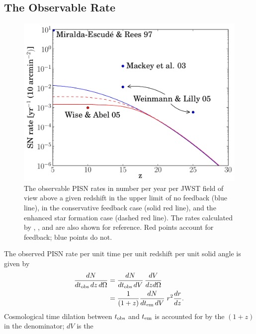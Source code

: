 \documentclass{thesis}
\begin{document}
\subsection{The Observable Rate}
\begin{figure}
 \begin{center}
   \includegraphics[width=\columnwidth]{observableRate}
   \caption{\footnotesize The observable PISN rates in number per year
     per JWST field of view above a given redshift in the upper limit
     of no feedback (blue line), in the conservative feedback case
     (solid red line), and the enhanced star formation case (dashed
     red line).  The rates calculated by
     \citet{Miralda-EscudeRees1997}, \citet{MackeyBrommHernquist2003},
     \citet{WeinmannLilly2005} and \citet{WiseAbel2005} are also shown
     for reference. Red points account for feedback; blue points do
     not.}
   \label{obsrate}
 \end{center}
\end{figure}
The observed PISN rate per unit time per unit redshift per unit solid
angle is given by
\begin{equation}
  \begin{split}
    \frac{dN}{dt_{\rm obs}\,dz\,d\Omega} &= \frac{dN}{dt_{\rm
        obs}\,dV} \, \frac{dV}{dz d\Omega}
    \\ &=\frac{1}{(1+z)}\frac{dN}{dt_{\rm em}\,dV} \;r^2
    \frac{dr}{dz}.
 \end{split}
\end{equation}
Cosmological time dilation between $t_{\rm obs}$ and $t_{\rm em}$ is
accounted for by the $(1+z)$ in the denominator; $dV$ is the
\end{document}
